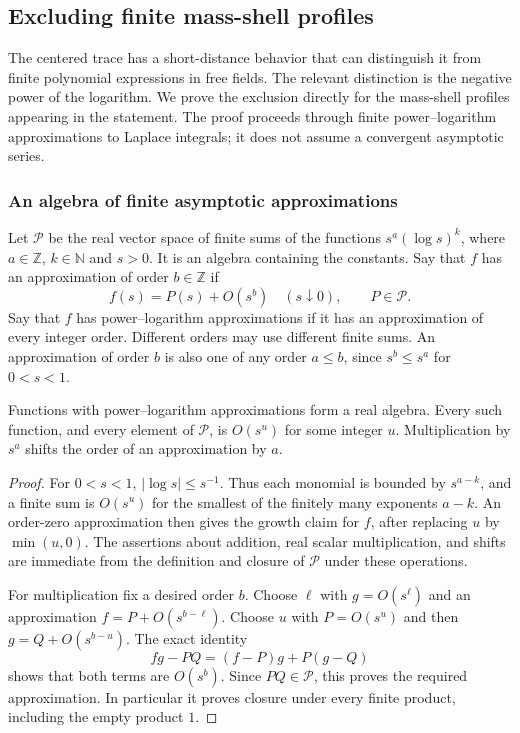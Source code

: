 \subsection{Excluding finite mass-shell profiles}
\label{sec:trace-profiles}
The centered trace has a short-distance behavior that can distinguish it from
finite polynomial expressions in free fields. The relevant distinction is the
negative power of the logarithm. We prove the exclusion directly for the
mass-shell profiles appearing in the statement. The proof proceeds through
finite power--logarithm approximations to Laplace integrals; it does not
assume a convergent asymptotic series.

\subsubsection{An algebra of finite asymptotic approximations}
Let $\mathcal P$ be the real vector space of finite sums of the functions
$s^a(\log s)^k$, where $a\in\mathbb Z$, $k\in\mathbb N$ and $s>0$.
It is an algebra containing the constants. Say that $f$ has an approximation
of order $b\in\mathbb Z$ if
\[
 f(s)=P(s)+O(s^b)\quad(s\downarrow0),\qquad P\in\mathcal P.
\]
Say that $f$ has power--logarithm approximations if it has an approximation
of every integer order. Different orders may use different finite sums.
An approximation of order $b$ is also one of any order $a\leq b$, since
$s^b\leq s^a$ for $0<s<1$.

\begin{lemma}\label{lem:profile-algebra}
Functions with power--logarithm approximations form a real algebra. Every
such function, and every element of $\mathcal P$, is $O(s^u)$ for some
integer $u$. Multiplication by $s^a$ shifts the order of an approximation
by $a$.
\end{lemma}
\begin{proof}
For $0<s<1$, $|\log s|\leq s^{-1}$. Thus each monomial is bounded by
$s^{a-k}$, and a finite sum is $O(s^u)$ for the smallest of the finitely
many exponents $a-k$. An order-zero approximation then gives the growth
claim for $f$, after replacing $u$ by $\min(u,0)$. The assertions about
addition, real scalar multiplication, and shifts are immediate from the
definition and closure of $\mathcal P$ under these operations.

For multiplication fix a desired order $b$. Choose $\ell$ with
$g=O(s^\ell)$ and an approximation $f=P+O(s^{b-\ell})$. Choose $u$ with
$P=O(s^u)$ and then $g=Q+O(s^{b-u})$. The exact identity
\[
 fg-PQ=(f-P)g+P(g-Q)
\]
shows that both terms are $O(s^b)$. Since $PQ\in\mathcal P$, this proves
the required approximation. In particular it proves closure under every
finite product, including the empty product $1$.
\end{proof}

